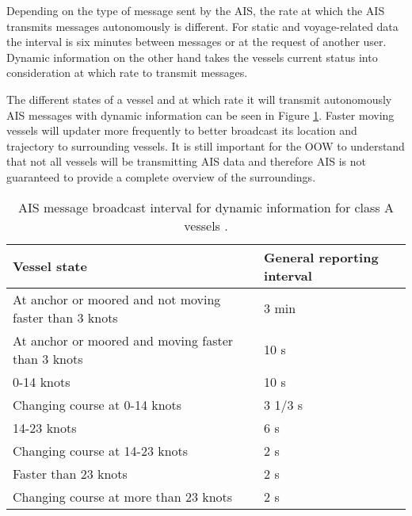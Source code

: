 \documentclass[../main.tex]{subfiles}
\begin{document}
Depending on the type of message sent by the AIS, the rate at which the AIS transmits messages autonomously is different. For static and voyage-related data the interval is six minutes between messages or at the request of another user. Dynamic information on the other hand takes the vessels current status into consideration at which rate to transmit messages.

The different states of a vessel and at which rate it will transmit autonomously AIS messages with dynamic information can be seen in Figure \ref{tab:ais-rates}. Faster moving vessels will updater more frequently to better broadcast its location and trajectory to surrounding vessels. It is still important for the OOW to understand that not all vessels will be transmitting AIS data and therefore AIS is not guaranteed to provide a complete overview of the surroundings.

\begin{table}[H]
\centering
\begin{tabular}{|m{7cm}|m{4cm}|}
\hline
\rowcolor[HTML]{C0C0C0} 
\textbf{Vessel state}                                  & \textbf{General reporting interval} \\ \hline
At anchor or moored and not moving faster than 3 knots & 3 min                               \\ \hline
At anchor or moored and moving faster than 3 knots     & 10 s                                \\ \hline
0-14 knots                                             & 10 s                                \\ \hline
Changing course at 0-14 knots                          & 3 1/3 s                             \\ \hline
14-23 knots                                            & 6 s                                 \\ \hline
Changing course at 14-23 knots                         & 2 s                                 \\ \hline
Faster than 23 knots                                   & 2 s                                 \\ \hline
Changing course at more than 23 knots                  & 2 s                                 \\ \hline
\end{tabular}
\caption{AIS message broadcast interval for dynamic information for class A vessels \cite{IMO_2015}.}
\label{tab:ais-rates}
\end{table}
\end{document}
